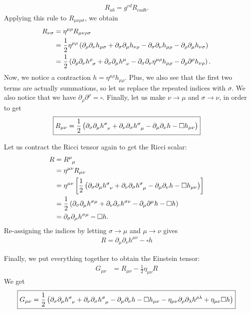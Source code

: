 \documentclass{book}
\numberwithin{equation}{section}
\theoremstyle{definition}
\newcommand{\p}{\partial}
\newcommand{\f}[2]{\frac{#1}{#2}}
\newcommand{\lp}{\left(}
\newcommand{\rp}{\right)}
\newcommand{\lb}{\left[}
\newcommand{\rb}{\right]}
\begin{document}
\begin{align}
R_{ab} = g^{cd}R_{cadb}.
\end{align}
Applying this rule to $R_{\mu\nu\rho\sigma}$, we obtain
\begin{align}
R_{\nu\sigma} &= \eta^{\mu\rho}R_{\mu\nu\rho\sigma} \\ 
&= \f{1}{2}\eta^{\mu\rho}\lp  \p_\rho\p_\nu h_{\mu\sigma} + \p_\sigma\p_\mu h_{\nu\rho} - \p_\sigma\p_\nu h_{\mu\rho} - \p_\rho \p_\mu h_{\nu\sigma}  \rp \\
&= \f{1}{2}\lp \p_\rho \p_\nu \tensor{h}{^\rho_\sigma} + \p_\sigma\p_\mu \tensor{h}{^\mu_\nu} - \p_\sigma\p_\nu \eta^{\mu\rho}h_{\mu\rho} - \p_\rho\p^\rho h_{\nu\rho}\rp.
\end{align}
Now, we notice a contraction $h = \eta^{\mu\rho}h_{\mu\rho}$. Plus, we also see that the first two terms are actually summations, so let us replace the repeated indices with $\sigma$. We also notice that we have $\p_\rho \p^\rho = \square$. Finally, let us make $\nu\to \mu$ and $\sigma \to \nu$, in order to get
\begin{align}
\boxed{R_{\mu\nu} = \f{1}{2}
\lp 
\p_\sigma\p_\mu \tensor{h}{^\sigma_\nu} + \p_\nu \p_\sigma \tensor{h}{^\sigma_\mu}
- \p_\mu\p_\nu h - \square h_{\mu\nu}
\rp}
\end{align}


Let us contract the Ricci tensor again to get the Ricci scalar:
\begin{align}
R &= \tensor{R}{^\mu_\mu}\\
&= \eta^{\mu\nu}R_{\mu\nu}\\
&= \eta^{\mu\nu}\lb \f{1}{2}
\lp 
\p_\sigma\p_\mu \tensor{h}{^\sigma_\nu} + \p_\nu \p_\sigma \tensor{h}{^\sigma_\mu}
- \p_\mu\p_\nu h - \square h_{\mu\nu}
\rp \rb\\
&=  \f{1}{2}\lp \p_\sigma \p_\mu h^{\sigma\mu} + \p_\nu\p_\sigma h^{\sigma\nu} - \p_\mu \p^\mu h - \square h \rp\\
&= \p_\sigma \p_\mu h^{\sigma\mu} - \square h.
\end{align}
Re-assigning the indices by letting $\sigma \to \mu$ and $\mu\to\nu $ gives
\begin{align}
\boxed{R = \p_\mu \p_\nu h^{\mu\nu} - \square h}
\end{align}

 
Finally, we put everything together to obtain the Einstein tensor:
\begin{align}
G_{\mu\nu} &= R_{\mu\nu} - \f{1}{2}\eta_{\mu\nu}R
\end{align}
We get
\begin{align}
\boxed{G_{\mu\nu} = \f{1}{2}\lp  \p_\sigma\p_\mu \tensor{h}{^\sigma_\nu} + \p_\nu \p_\sigma \tensor{h}{^\sigma_\mu}- \p_\mu\p_\nu h - \square h_{\mu\nu} - \eta_{\mu\nu}\p_\rho\p_\lambda h^{\rho\lambda} + \eta_{\mu\nu}\square h  \rp}
\end{align}
\end{document}

